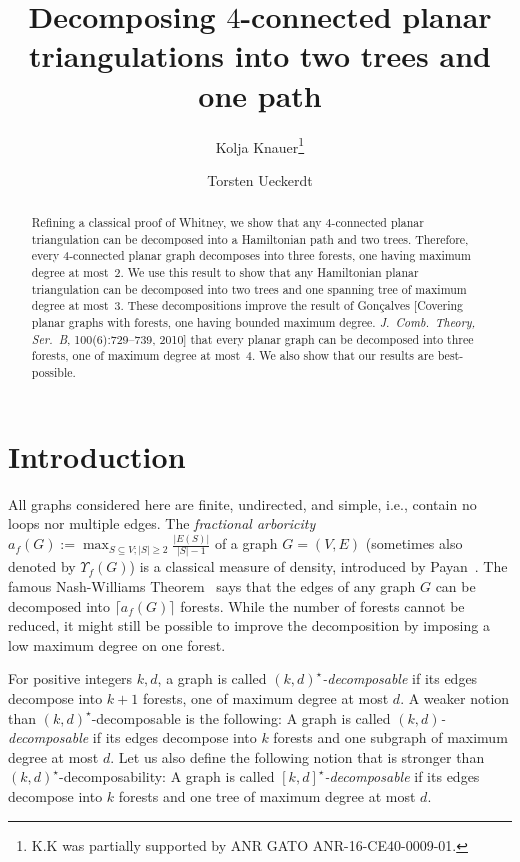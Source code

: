 \documentclass[a4paper,10pt]{article}
\title{Decomposing $4$-connected planar triangulations into two trees and one path}
\author[1]{Kolja Knauer\thanks{K.K was partially supported by ANR GATO ANR-16-CE40-0009-01.}}
\author[2]{Torsten Ueckerdt}
\affil[1]{Aix Marseille Univ, Universit\'e de Toulon, CNRS, LIS, Marseille, France}
\affil[2]{Karlsruhe Institute of Technology (KIT), 
Institute of Theoretical Informatics}
\theoremstyle{plain}
\begin{document}
\maketitle

\begin{abstract}
 Refining a classical proof of Whitney, we show that any $4$-connected planar triangulation can be decomposed into a Hamiltonian path and two trees.
 Therefore, every $4$-connected planar graph decomposes into three forests, one having maximum degree at most~$2$.
 We use this result to show that any Hamiltonian planar triangulation can be decomposed into two trees and one spanning tree of maximum degree at most~$3$.
 These decompositions improve the result of Gon\c{c}alves [Covering planar graphs with forests, one having bounded maximum degree. \textit{J.\ Comb.\ Theory, Ser.\ B}, 100(6):729--739, 2010] that every planar graph can be decomposed into three forests, one of maximum degree at most~$4$.
 We also show that our results are best-possible.%
\end{abstract}








\section{Introduction}

All graphs considered here are finite, undirected, and simple, i.e., contain no loops nor multiple edges.
The \emph{fractional arboricity} $a_f(G):=\max_{S\subseteq V; |S|\geq 2}\frac{|E(S)|}{|S|-1}$ of a graph $G = (V,E)$ (sometimes also denoted by $\Upsilon_f(G)$) is a classical measure of density, introduced by Payan~\cite{Pay-86}.
The famous Nash-Williams Theorem~\cite{Nas-61} says that the edges of any graph $G$ can be decomposed into $\lceil a_f(G)\rceil$ forests.
While the number of forests cannot be reduced, it might still be possible to improve the decomposition by imposing a low maximum degree on one forest.

For positive integers $k,d$, a graph is called \emph{$(k,d)^\star$-decomposable} if its edges decompose into $k+1$ forests, one of maximum degree at most $d$.
A weaker notion than $(k,d)^\star$-decomposable is the following:
A graph is called \emph{$(k,d)$-decomposable} if its edges decompose into $k$ forests and one subgraph of maximum degree at most $d$.
Let us also define the following notion that is stronger than $(k,d)^\star$-decomposability:
A graph is called \emph{$[k,d]^\star$-decomposable} if its edges decompose into $k$ forests and one tree of maximum degree at most $d$.
\end{document}
